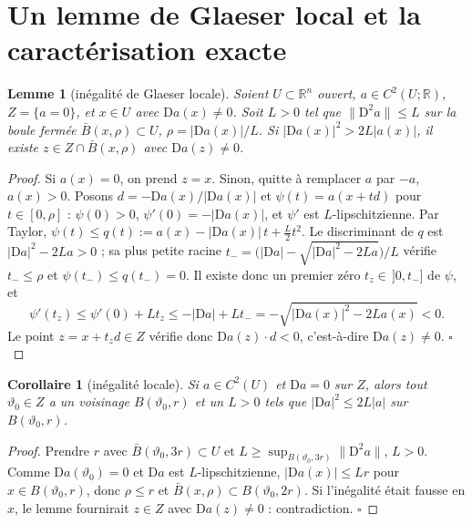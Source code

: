 \documentclass[11pt,a4paper]{article}
\newtheorem{lemme}[theoreme]{Lemme}
\newtheorem{corollaire}[theoreme]{Corollaire}
\theoremstyle{remark}
\newcommand{\R}{\mathbb R}
\newcommand{\vth}{\vartheta}
\newcommand{\D}{\mathrm D}
\begin{document}
\section{Un lemme de Glaeser local et la caractérisation exacte}
\begin{lemme}[inégalité de Glaeser locale]\label{lem:glaeser}
Soient $U\subset\R^n$ ouvert, $a\in C^2(U;\R)$, $Z=\{a=0\}$, et $x\in U$ avec $\D a(x)\ne0$. Soit $L>0$ tel que $\lVert\D^2a\rVert\le L$ sur la boule fermée $\bar B(x,\rho)\subset U$, $\rho=\lvert\D a(x)\rvert/L$. Si $\lvert\D a(x)\rvert^2>2L\lvert a(x)\rvert$, il existe $z\in Z\cap\bar B(x,\rho)$ avec $\D a(z)\ne0$.
\end{lemme}
\begin{proof}
Si $a(x)=0$, on prend $z=x$. Sinon, quitte à remplacer $a$ par $-a$, $a(x)>0$. Posons $d=-\D a(x)/\lvert\D a(x)\rvert$ et $\psi(t)=a(x+td)$ pour $t\in[0,\rho]$ : $\psi(0)>0$, $\psi'(0)=-\lvert\D a(x)\rvert$, et $\psi'$ est $L$-lipschitzienne. Par Taylor, $\psi(t)\le q(t):=a(x)-\lvert\D a(x)\rvert\,t+\tfrac L2t^2$. Le discriminant de $q$ est $\lvert\D a\rvert^2-2La>0$ ; sa plus petite racine $t_-=\bigl(\lvert\D a\rvert-\sqrt{\lvert\D a\rvert^2-2La}\bigr)/L$ vérifie $t_-\le\rho$ et $\psi(t_-)\le q(t_-)=0$. Il existe donc un premier zéro $t_z\in\,]0,t_-]$ de $\psi$, et
\[
\psi'(t_z)\le\psi'(0)+Lt_z\le-\lvert\D a\rvert+Lt_-=-\sqrt{\lvert\D a(x)\rvert^2-2La(x)}<0 .
\]
Le point $z=x+t_zd\in Z$ vérifie donc $\D a(z)\cdot d<0$, c'est-à-dire $\D a(z)\ne0$. $\square$
\end{proof}

\begin{corollaire}[inégalité locale]\label{cor:glaeser}
Si $a\in C^2(U)$ et $\D a=0$ sur $Z$, alors tout $\vth_0\in Z$ a un voisinage $B(\vth_0,r)$ et un $L>0$ tels que $\lvert\D a\rvert^2\le2L\lvert a\rvert$ sur $B(\vth_0,r)$.
\end{corollaire}
\begin{proof}
Prendre $r$ avec $\bar B(\vth_0,3r)\subset U$ et $L\ge\sup_{B(\vth_0,3r)}\lVert\D^2a\rVert$, $L>0$. Comme $\D a(\vth_0)=0$ et $\D a$ est $L$-lipschitzienne, $\lvert\D a(x)\rvert\le Lr$ pour $x\in B(\vth_0,r)$, donc $\rho\le r$ et $\bar B(x,\rho)\subset B(\vth_0,2r)$. Si l'inégalité était fausse en $x$, le lemme fournirait $z\in Z$ avec $\D a(z)\ne0$ : contradiction. $\square$
\end{proof}
\end{document}
